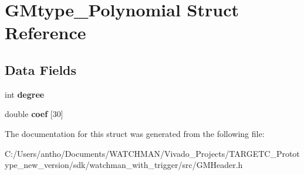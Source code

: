 \section{G\+Mtype\+\_\+\+Polynomial Struct Reference}
\label{struct_g_mtype___polynomial}
\subsection*{Data Fields}
\begin{DoxyCompactItemize}
\item 
\mbox{\label{struct_g_mtype___polynomial_a3ad2418bacc6ee3c0ff8cc6ed2832ec9}} 
int {\bfseries degree}
\item 
\mbox{\label{struct_g_mtype___polynomial_a74f9887b0a3d50d4c985fffe39b11ad5}} 
double {\bfseries coef} [30]
\end{DoxyCompactItemize}


The documentation for this struct was generated from the following file\+:\begin{DoxyCompactItemize}
\item 
C\+:/\+Users/antho/\+Documents/\+W\+A\+T\+C\+H\+M\+A\+N/\+Vivado\+\_\+\+Projects/\+T\+A\+R\+G\+E\+T\+C\+\_\+\+Prototype\+\_\+new\+\_\+version/sdk/watchman\+\_\+with\+\_\+trigger/src/G\+M\+Header.\+h\end{DoxyCompactItemize}

